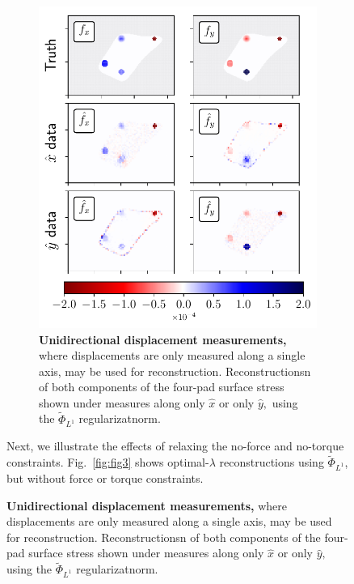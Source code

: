 \documentclass[aps,prl,reprint,twocolumn,groupedaddress,showpacs]{revtex4}
\begin{document}
\begin{figure}
\begin{figure}
\includegraphics[width=\linewidth]{unidirectionfig}
\caption{\textbf{Unidirectional displacement measurements,} where displacements
are only measured along a single axis, may be used for reconstruction. Reconstructionsn 
of both components of the four-pad surface stress shown under measures along only $\hat{x}$
or only $\hat{y},$ using the $\tilde{\Phi}_{L^1}$ regularizatnorm.}
\label{XYONLY}
\end{figure}



Next, we illustrate the effects of relaxing the no-force and no-torque
constraints.  Fig.~\ref{fig:fig3} shows optimal-$\lambda$
reconstructions using $\tilde{\Phi}_{L^{1}}$, but without force or
torque constraints.


\end{figure}
\end{document}
